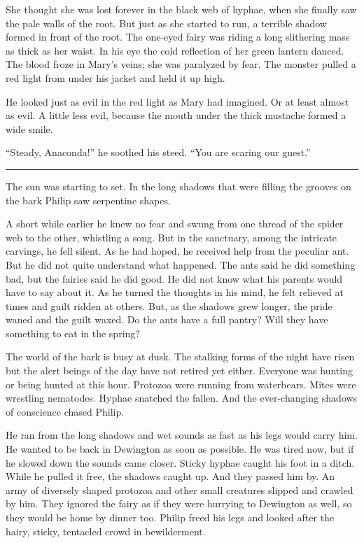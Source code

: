 \documentclass[10pt, draft]{memoir}
\renewcommand{\pfbreakdisplay}{\bigskip \ding{166} \bigskip}
\newcommand{\secbreak}{\fancybreak{\pfbreakdisplay}}
\begin{document}
She thought she was lost forever in the black web of hyphae, when she finally
saw the pale walls of the root. But just as she started to run, a terrible
shadow formed in front of the root. The one-eyed fairy was riding a long
slithering mass as thick as her waist. In his eye the cold reflection of her
green lantern danced. The blood froze in Mary's veins; she was paralyzed by
fear. The monster pulled a red light from under his jacket and held it up high.

He looked just as evil in the red light as Mary had imagined. Or at least
almost as evil. A little less evil, because the mouth under the thick mustache
formed a wide smile.

``Steady, Anaconda!'' he soothed his steed. ``You are scaring our guest.''

\secbreak

The sun was starting to set. In the long shadows that were filling the grooves
on the bark Philip saw serpentine shapes.

A short while earlier he knew no fear and swung from one thread of the spider
web to the other, whistling a song. But in the sanctuary, among the intricate
carvings, he fell silent. As he had hoped, he received help from the peculiar
ant. But he did not quite understand what happened. The ants said he did
something bad, but the fairies said he did good. He did not know what his
parents would have to say about it. As he turned the thoughts in his mind, he
felt relieved at times and guilt ridden at others. But, as the shadows grew
longer, the pride waned and the guilt waxed. Do the ants have a full pantry?
Will they have something to eat in the spring?

The world of the bark is busy at dusk. The stalking forms of the night have
risen but the alert beings of the day have not retired yet either. Everyone was
hunting or being hunted at this hour. Protozoa were running from waterbears.
Mites were wrestling nematodes. Hyphae snatched the fallen. And the
ever-changing shadows of conscience chased Philip.

He ran from the long shadows and wet sounds as fast as his legs would carry
him. He wanted to be back in Dewington as soon as possible. He was tired now,
but if he slowed down the sounds came closer. Sticky hyphae caught his foot in
a ditch. While he pulled it free, the shadows caught up. And they passed him
by. An army of diversely shaped protozoa and other small creatures slipped and
crawled by him. They ignored the fairy as if they were hurrying to Dewington as
well, so they would be home by dinner too. Philip freed his legs and looked
after the hairy, sticky, tentacled crowd in bewilderment.
\end{document}
